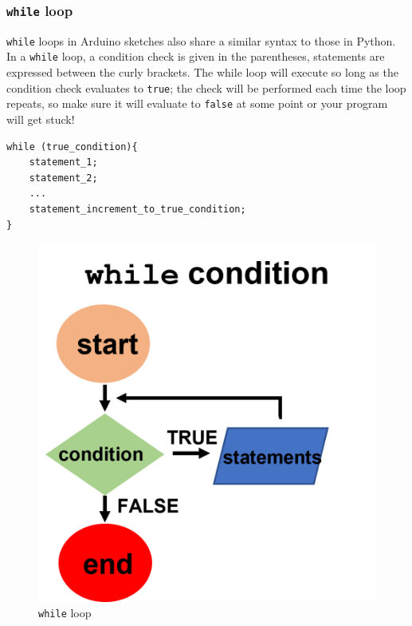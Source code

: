 \documentclass{article}
\begin{document}
\subsubsection{\texttt{while} loop}
\begin{minipage}{.6\textwidth}
\texttt{while} loops in Arduino sketches also share a similar syntax to those in Python. In a \texttt{while} loop, a condition check is given in the parentheses, statements are expressed between the curly brackets. The while loop will execute so long as the condition check evaluates to \texttt{true}; the check will be performed each time the loop repeats, so make sure it will evaluate to \texttt{false} at some point or your program will get stuck! \vspace{.2cm}
\begin{lstlisting}[caption=while loop]
while (true_condition){
    statement_1;
    statement_2;
    ...
    statement_increment_to_true_condition;
}
\end{lstlisting}
\end{minipage}\hfill
\begin{minipage}{.35\textwidth}
\begin{figure}[H]\vspace{-1cm}
    \centering
    \includegraphics[width=.75\textwidth]{while.png}
    \caption{\texttt{while} loop}
\end{figure}
\end{minipage}
\end{document}
